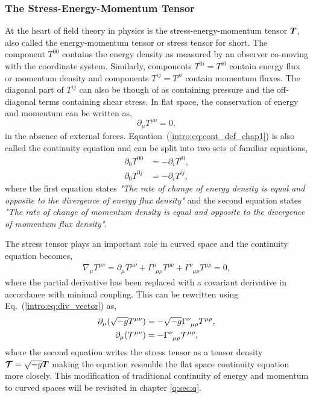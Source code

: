 \subsubsection{The Stress-Energy-Momentum Tensor}
At the heart of field theory in physics is the stress-energy-momentum tensor $\boldsymbol{T}$, also called the energy-momentum tensor or stress tensor for short. \color{orchid} The component $T^{00}$ contains the energy density as measured by an observer co-moving with the coordinate system.
\color{black} Similarly, components $T^{0i}=T^{i0}$ contain energy flux or momentum density and components $T^{ij}=T^{ji}$ contain momentum fluxes. The diagonal part of $T^{ij}$ can also be though of as containing pressure and the off-diagonal terms containing shear stress. In flat space, the conservation of energy and momentum can be written as,
\begin{equation}
\partial_\mu T^{\mu\nu} =0,\label{intro:eq:cont_def_chap1}
\end{equation}
in the absence of external forces. Equation~(\ref{intro:eq:cont_def_chap1}) is also called the continuity equation and can be split into two sets of familiar equations,
\begin{align}
\partial_0 T^{00} &= - \partial_i T^{i0}, \\
\partial_0 T^{0j} &= - \partial_i T^{ij},
\end{align}
where the first equation states {\it "The rate of change of energy density is equal and opposite to the divergence of energy flux density"} and the second equation states {\it "The rate of change of momentum density is equal and opposite to the divergence of momentum flux density"}.

The stress tensor plays an important role in curved space and the continuity equation becomes,
\begin{align}
\nabla_\mu T^{\mu\nu} = \partial_\mu T^{\mu\nu}  + \Gamma^\mu_{\,\,\,\mu \rho}T^{\rho \nu}  + \Gamma^\nu_{\,\,\,\mu\rho}T^{\mu\rho}= 0\label{intro:eq:cont},
\end{align}
where the partial derivative has been replaced with a covariant derivative in accordance with minimal coupling. This can be rewritten using Eq.~(\ref{intro:eq:div_vector}) as,
\begin{align}
\partial_\mu( \sqrt{-g} T^{\mu\nu})  &=-\sqrt{-g} \Gamma^\nu_{\,\,\,\mu\rho}T^{\mu\rho},\\
\partial_\mu( \mathcal{T}^{\mu\nu})  &=-\Gamma^\nu_{\,\,\,\mu\rho}\mathcal{T}^{\mu\rho},
\end{align}
where the second equation writes the stress tensor as a tensor density $\boldsymbol{\mathcal{T}} = \sqrt{-g} \boldsymbol{T}$ making the equation resemble the flat space continuity equation more closely. This modification of traditional continuity of energy and momentum to curved spaces will be revisited in chapter \ref{q:sec:q}.



